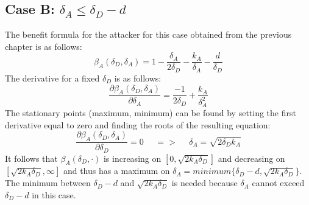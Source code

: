 \subsection*{Case B: $ \delta_{A} \leq \delta_{D} -d$ }
The benefit formula for the attacker for this case obtained from the previous chapter is as follows:
\begin{equation*}
\beta_{A}(\delta_{D},\delta_{A}) =1- \dfrac{\delta_{A}}{2\delta_{D}} - \dfrac{k_{A}}{\delta_{A}} - \dfrac{d}{\delta_{D}}
\end{equation*}
The derivative for a fixed $\delta_{D}$ is as follows:
\begin{equation*}
\dfrac{\partial \beta_{A}(\delta_{D},\delta_{A})}{\partial \delta_{A}} = \dfrac{-1}{2\delta_{D}} + \dfrac{k_{A}}{\delta_{A}^{2}}
\end{equation*}
The stationary points (maximum, minimum) can be found by setting the first derivative equal to zero and finding the roots of the resulting equation:
\begin{equation*}
\frac{\partial \beta_{A}(\delta_{D},\delta_{A})}{\partial \delta_{D}} =0 ~~~~~~ =>~~~~~~ \delta_{A} = \sqrt{2\delta_{D}k_{A}}
\end{equation*}
It follows that $\beta_{A}(\delta_{D},\cdot)$ is increasing on $[0,\sqrt{2k_{A}\delta_{D}}]$ and decreasing on $[\sqrt{2k_{A}\delta_{D}}, \infty]$ and thus has a maximum on $\delta_{A} = minimum \{\delta_{D} -d, \sqrt{2k_{A}\delta_{D}} \} $. The minimum between $\delta_{D}-d$ and $ \sqrt{2k_{A}\delta_{D}}$ is needed because $\delta_{A} $ cannot exceed $\delta_{D}-d$ in this case. \\

